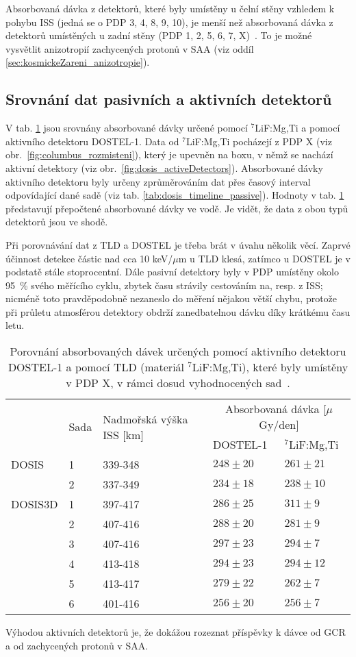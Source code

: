 Absorbovaná dávka z detektorů, které byly umístěny u čelní stěny vzhledem k pohybu ISS (jedná se o PDP 3, 4, 8, 9, 10), je menší než absorbovaná dávka z detektorů umístěných u zadní stěny (PDP 1, 2, 5, 6, 7, X)~\cite{dosis}. To je možné vysvětlit anizotropií zachycených protonů v SAA (viz oddíl \ref{sec:kosmickeZareni_anizotropie}).
\subsection{Srovnání dat pasivních a aktivních detektorů}%
V tab. \ref{tab:dosis_vysl_srovnaniPassiveActive} jsou srovnány absorbované dávky určené pomocí $^7$LiF:Mg,Ti a pomocí aktivního detektoru DOSTEL-1. Data od $^7$LiF:Mg,Ti pocházejí z PDP X (viz obr.~\ref{fig:columbus_rozmisteni}), který je upevněn na boxu, v němž se nachází aktivní detektory (viz obr.~\ref{fig:dosis_activeDetectors}). Absorbované dávky aktivního detektoru byly určeny zprůměrováním dat přes časový interval odpovídající dané sadě (viz tab. \ref{tab:dosis_timeline_passive}). Hodnoty v tab. \ref{tab:dosis_vysl_srovnaniPassiveActive} představují přepočtené absorbované dávky ve vodě. Je vidět, že data z obou typů detektorů jsou ve shodě. 

Při porovnávání dat z TLD a DOSTEL je třeba brát v úvahu několik věcí. Zaprvé účinnost detekce částic nad cca 10 keV/$\mu$m u TLD klesá, zatímco u DOSTEL je v podstatě stále stoprocentní. Dále pasivní detektory byly v PDP umístěny okolo 95~\% svého měřícího cyklu, zbytek času strávily cestováním na, resp. z ISS; nicméně toto pravděpodobně nezaneslo do měření nějakou větší chybu, protože při průletu atmosférou detektory obdrží zanedbatelnou dávku díky krátkému času letu.
\begin{table}[H]
  \centering
  \def\arraystretch{1}
  \footnotesize
  \caption{Porovnání absorbovaných dávek určených pomocí aktivního detektoru DOSTEL-1 a pomocí TLD (materiál $^7$LiF:Mg,Ti), které byly umístěny v PDP X, v rámci dosud vyhodnocených sad~\cite{dosis}.}
  \label{tab:dosis_vysl_srovnaniPassiveActive}
  \begin{tabular}{lll|ll}
	\toprule
	&\multirow{2}{*}{Sada}&\multirow{2}{*}{Nadmořská výška ISS [km]}&\multicolumn{2}{c}{Absorbovaná dávka [$\mu$Gy/den]}\\
	 & & &DOSTEL-1&$^7$LiF:Mg,Ti\\
	\midrule
	DOSIS	&1&339-348&$248\pm20$&$261\pm21$\\ 
    		&2&337-349&$234\pm18$&$238\pm10$\\
    DOSIS3D	&1&397-417&$286\pm25$&$311\pm9 $\\
    		&2&407-416&$288\pm20$&$281\pm9 $\\
    		&3&407-416&$297\pm23$&$294\pm7 $\\
    		&4&413-418&$294\pm23$&$294\pm12$\\
    		&5&413-417&$279\pm22$&$262\pm7 $\\
    		&6&401-416&$256\pm20$&$256\pm7 $\\
	\bottomrule
  \end{tabular}
\end{table}

Výhodou aktivních detektorů je, že dokážou rozeznat příspěvky k dávce od GCR a od zachycených protonů v SAA.


